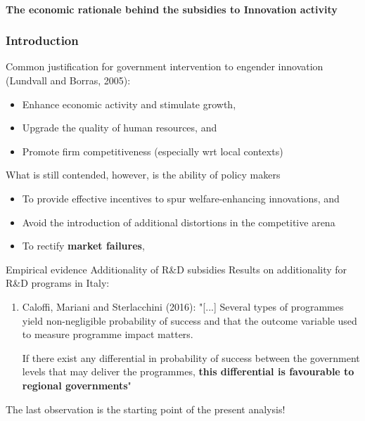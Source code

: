 \documentclass[10pt,handout,xcolor=pdftex,dvipsnames,table]{beamer}
\begin{document}
\begin{frame}
\framesubtitle{The economic rationale behind the subsidies to Innovation activity}
\frametitle{Introduction}
	\begin{block}{Common justification for government intervention to engender innovation (Lundvall and Borras, 2005):}
		\begin{itemize}
		\item Enhance economic activity and stimulate growth, 
		\item Upgrade the quality of human resources, and 
		\item Promote firm competitiveness (especially wrt local contexts) 
		\end{itemize}
	\end{block}	
	
	\begin{block}{What is still contended, however, is the ability of policy makers}
		\begin{itemize}
			\item To provide effective incentives to spur welfare-enhancing innovations, and 
			\item Avoid the introduction of additional distortions in the competitive arena 		\item To rectify {\bf market failures}, 
		\end{itemize}
	\end{block}	
\end{frame}
\begin{frame}{Empirical evidence}
{Additionality of R\&D subsidies}
Results on additionality for R\&D programs in Italy: 
\begin{enumerate}
\item Caloffi, Mariani and Sterlacchini (2016):
"[...] Several types of programmes yield non-negligible probability of success and that the outcome variable used to measure programme impact matters. 

If there exist any differential in probability of success between the government levels that may deliver the programmes, {\bf this differential is favourable to  regional governments}"
\end{enumerate}
\begin{block}{The last observation  is the starting point of the present analysis!}
\end{block}	
\end{frame}
\end{document}
